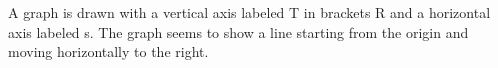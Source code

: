 A graph is drawn with a vertical axis labeled T in brackets R and a horizontal axis labeled s. The graph seems to show a line starting from the origin and moving horizontally to the right.